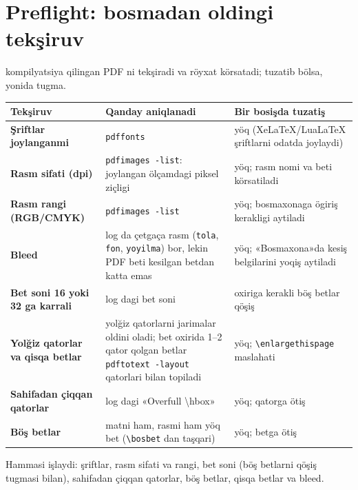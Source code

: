 \section{Preflight: bosmadan oldingi tekşiruv}\label{sec:sd-preflight}
 kompilyatsiya qilingan PDF ni tekşiradi va röyxat körsatadi; tuzatib bölsa, yonida tugma. \beta
\begin{center}\footnotesize
\begin{tabularx}{\linewidth}{>{\bfseries}p{36mm}X>{\raggedright\arraybackslash}p{40mm}}
\toprule
Tekşiruv & Qanday aniqlanadi & Bir bosişda tuzatiş\\
\midrule
Şriftlar joylanganmi & \texttt{pdffonts} & yöq (XeLaTeX/LuaLaTeX şriftlarni odatda joylaydi)\\
Rasm sifati (dpi) & \texttt{pdfimages -list}: joylangan ölçamdagi piksel ziçligi & yöq; rasm nomi va beti körsatiladi\\
Rasm rangi (RGB/CMYK) & \texttt{pdfimages -list} & yöq; bosmaxonaga ögiriş kerakligi aytiladi\\
Bleed & log da çetgaça rasm (\texttt{tola}, \texttt{fon}, \texttt{yoyilma}) bor, lekin PDF beti kesilgan betdan katta emas & yöq; «Bosmaxona»da kesiş belgilarini yoqiş aytiladi\\
Bet soni 16 yoki 32 ga karrali & log dagi bet soni & oxiriga kerakli böş betlar qöşiş\\
Yolğiz qatorlar va qisqa betlar & yolğiz qatorlarni jarimalar oldini oladi; bet oxirida 1--2 qator qolgan betlar \texttt{pdftotext -layout} qatorlari bilan topiladi & yöq; \texttt{\textbackslash enlargethispage} maslahati\\
Sahifadan çiqqan qatorlar & log dagi «Overfull \textbackslash hbox» & yöq; qatorga ötiş\\
Böş betlar & matni ham, rasmi ham yöq bet (\texttt{\textbackslash bosbet} dan taşqari) & yöq; betga ötiş\\
\bottomrule
\end{tabularx}
\end{center}
Hammasi işlaydi: şriftlar, rasm sifati va rangi, bet soni (böş betlarni qöşiş tugmasi bilan), sahifadan çiqqan qatorlar, böş betlar, qisqa betlar va bleed.

